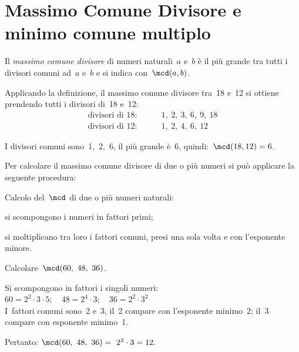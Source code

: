 
\section{Massimo Comune Divisore e minimo comune multiplo}
\label{sec:01_mcdemcm}

\label{def:mcd}
\begin{definizione}
Il \emph{massimo comune divisore} di numeri naturali~\(a\) e~\(b\)  è il
più grande tra tutti i divisori comuni ad~\(a\) e~\(b\)
e si indica con~\(\mcd(a,b)\).
\end{definizione}

Applicando la definizione, il massimo comune divisore tra~18 e~12 si 
ottiene prendendo tutti i divisori di~18 e~12:
\begin{align*}
\text{divisori di }18: & \qquad 1,~2,~3,~6,~9,~18\\
\text{divisori di }12: & \qquad 1,~2,~4,~6,~12
\end{align*}

I divisori comuni sono~1,~2,~6, il più grande è~6, quindi:~\(\mcd(18, 
12)=6\). 


Per calcolare il massimo comune divisore di due o più numeri si può 
applicare la seguente procedura:

\begin{procedura}
Calcolo del~\(\mcd\) di due o più numeri naturali:
\begin{enumeratea}
 \item si scompongono i numeri in fattori primi;
 \item si moltiplicano tra loro i fattori comuni, 
  presi una sola volta e con l'esponente minore.
\end{enumeratea}
\end{procedura}


\begin{esempio}
Calcolare~\(\mcd(60,~48,~36)\).

Si scompongono in fattori i singoli numeri:\\
\(60 = 2^2\cdot3\cdot5; \quad 48 = 2^4\cdot3; \quad 36 = 2^2\cdot3^2\)\\
I~fattori comuni sono~2 e~3, il~2 compare con l'esponente minimo~2; 
il~3 compare con esponente minimo~1.

Pertanto: \quad \(\mcd(60,~48,~36)=~2^2 \cdot 3 = 12\).
\end{esempio}

